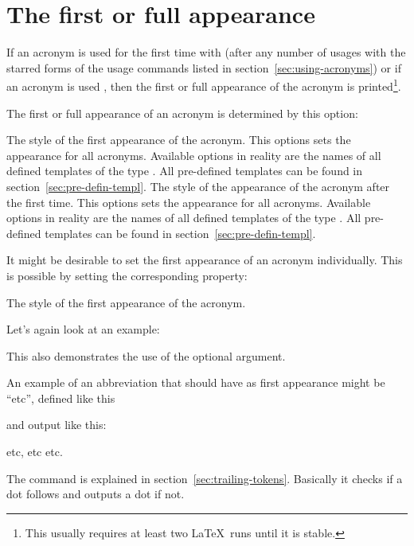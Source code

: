 \documentclass{acro-manual}
\begin{document}
\section{The first or full appearance}\label{sec:first-or-full}
If an acronym is used for the first time with  (after any number of
usages with the starred forms of the usage commands listed in
section~\vref{sec:using-acronyms}) or if an acronym is used , then the
first or full appearance of the acronym is printed\footnote{This usually
  requires at least two \LaTeX\ runs until it is stable.}.

The first or full appearance of an acronym is determined by this option:
\begin{options}
    The style of the first appearance of the acronym. This options sets the
    appearance for all acronyms.  Available options in reality are the names
    of all defined templates of the type . All pre-defined
    templates can be found in section~\vref{sec:pre-defin-templ}.
    The style of the appearance of the acronym after the
    first time. This options sets the appearance for all acronyms.  Available
    options in reality are the names of all defined templates of the type
    . All pre-defined templates can be found in
    section~\vref{sec:pre-defin-templ}.
\end{options}
It might be desirable to set the first appearance of an acronym
individually. This is possible by setting the corresponding property:
\begin{properties}
  \Initial
    The style of the first appearance of the acronym.
\end{properties}
Let's again look at an example:
This also demonstrates the use of the optional argument.

An example of an abbreviation that should have  as first appearance
might be \enquote{\acs*{etc}}, defined like this
\begin{sourcecode}
\end{sourcecode}
and output like this:
\begin{example}
  \ac{etc}, \ac{etc} \ac{etc}.
\end{example}
The command  is explained in section~\vref{sec:trailing-tokens}.
Basically it checks if a dot follows and outputs a dot if not.
\end{document}
